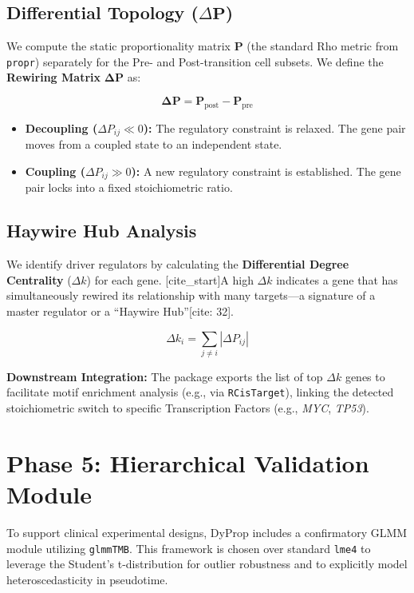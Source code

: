 \documentclass[11pt, a4paper]{article}
\begin{document}
\subsection{Differential Topology ($\Delta \mathbf{P}$)}
We compute the static proportionality matrix $\mathbf{P}$ (the standard Rho metric from \texttt{propr}) separately for the Pre- and Post-transition cell subsets. We define the \textbf{Rewiring Matrix} $\mathbf{\Delta P}$ as:

$$ \mathbf{\Delta P} = \mathbf{P}_{\text{post}} - \mathbf{P}_{\text{pre}} $$

\begin{itemize}
    \item \textbf{Decoupling ($\Delta P_{ij} \ll 0$):} The regulatory constraint is relaxed. The gene pair moves from a coupled state to an independent state.
    \item \textbf{Coupling ($\Delta P_{ij} \gg 0$):} A new regulatory constraint is established. The gene pair locks into a fixed stoichiometric ratio.
\end{itemize}

\subsection{Haywire Hub Analysis}
We identify driver regulators by calculating the \textbf{Differential Degree Centrality} ($\Delta k$) for each gene. [cite_start]A high $\Delta k$ indicates a gene that has simultaneously rewired its relationship with many targets---a signature of a master regulator or a ``Haywire Hub''[cite: 32].

$$ \Delta k_i = \sum_{j \neq i} |\Delta P_{ij}| $$

\noindent\textbf{Downstream Integration:} The package exports the list of top $\Delta k$ genes to facilitate motif enrichment analysis (e.g., via \texttt{RCisTarget}), linking the detected stoichiometric switch to specific Transcription Factors (e.g., \textit{MYC}, \textit{TP53}).

\section{Phase 5: Hierarchical Validation Module}

To support clinical experimental designs, DyProp includes a confirmatory GLMM module utilizing \texttt{glmmTMB}. This framework is chosen over standard \texttt{lme4} to leverage the Student's t-distribution for outlier robustness and to explicitly model heteroscedasticity in pseudotime.
\end{document}
